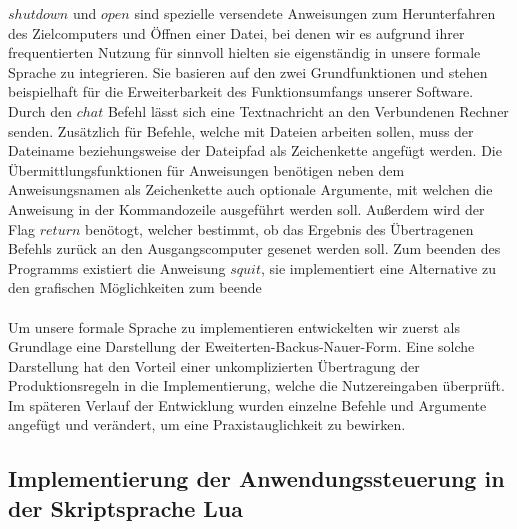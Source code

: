 $shutdown$ und $open$ sind spezielle versendete Anweisungen zum Herunterfahren des Zielcomputers und Öffnen einer Datei, bei denen wir es aufgrund ihrer frequentierten Nutzung für sinnvoll hielten sie eigenständig in unsere formale Sprache zu integrieren. Sie basieren auf den zwei Grundfunktionen und stehen beispielhaft für die Erweiterbarkeit des Funktionsumfangs unserer Software. Durch den $chat$ Befehl lässt sich eine Textnachricht an den Verbundenen Rechner senden.
Zusätzlich für Befehle, welche mit Dateien arbeiten sollen, muss der Dateiname beziehungsweise der Dateipfad als Zeichenkette angefügt werden. 
Die Übermittlungsfunktionen für Anweisungen benötigen neben dem Anweisungsnamen als Zeichenkette auch optionale Argumente, mit welchen die Anweisung in der Kommandozeile ausgeführt werden soll. Außerdem wird der Flag $return$ benötogt, welcher bestimmt, ob das Ergebnis des Übertragenen Befehls zurück an den Ausgangscomputer gesenet werden soll. Zum beenden des Programms existiert die Anweisung $squit$, sie implementiert eine Alternative zu den grafischen Möglichkeiten zum beende\\\\
Um unsere formale Sprache zu implementieren entwickelten wir zuerst als Grundlage eine Darstellung der Eweiterten-Backus-Nauer-Form. Eine solche Darstellung hat den Vorteil einer unkomplizierten Übertragung der Produktionsregeln in die Implementierung, welche die Nutzereingaben überprüft. Im späteren Verlauf der Entwicklung wurden einzelne Befehle und Argumente angefügt und verändert, um eine Praxistauglichkeit zu bewirken.

\subsection{Implementierung der Anwendungssteuerung in der Skriptsprache Lua}

